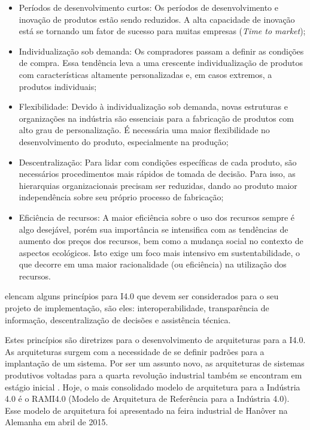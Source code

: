 \begin{itemize}

	\item Períodos de desenvolvimento curtos: Os períodos de desenvolvimento e inovação de produtos estão sendo reduzidos. A alta capacidade de inovação está se tornando um fator de sucesso para muitas empresas (\textit{Time to market});

	\item Individualização sob demanda: Os compradores passam a definir as condições de compra. Essa tendência leva a uma crescente individualização de produtos com características altamente personalizadas e, em casos extremos, a produtos individuais;

	\item Flexibilidade: Devido à individualização sob demanda, novas estruturas e organizações na indústria são essenciais para a fabricação de produtos com alto grau de personalização. É necessária uma maior flexibilidade no desenvolvimento do produto, especialmente na produção;

	\item Descentralização: Para lidar com condições específicas de cada produto, são necessários procedimentos mais rápidos de tomada de decisão. Para isso, as hierarquias organizacionais precisam ser reduzidas, dando ao produto maior independência sobre seu próprio processo de fabricação;

	\item Eficiência de recursos: A maior eficiência sobre o uso dos recursos sempre é algo desejável, porém sua importância se intensifica com as tendências de aumento dos preços dos recursos, bem como a mudança social no contexto de aspectos ecológicos. Isto exige um foco mais intensivo em sustentabilidade, o que decorre em uma maior racionalidade (ou eficiência) na utilização dos recursos.

\end{itemize}

 elencam alguns princípios para I4.0 que devem ser considerados para o seu projeto de implementação, são eles: interoperabilidade, transparência de informação, descentralização de decisões e assistência técnica.

Estes princípios são diretrizes para o desenvolvimento de arquiteturas para a I4.0. As arquiteturas surgem com a necessidade de se definir padrões para a implantação de um sistema. Por ser um assunto novo, as arquiteturas de sistemas produtivos voltadas para a quarta revolução industrial também se encontram em estágio inicial \cite{pisching2018arquitetura}. Hoje, o mais consolidado modelo de arquitetura para a Indústria 4.0 é o RAMI4.0 (Modelo de Arquitetura de Referência para a Indústria 4.0). Esse modelo de arquitetura foi apresentado na feira industrial de Hanôver na Alemanha em abril de 2015.

